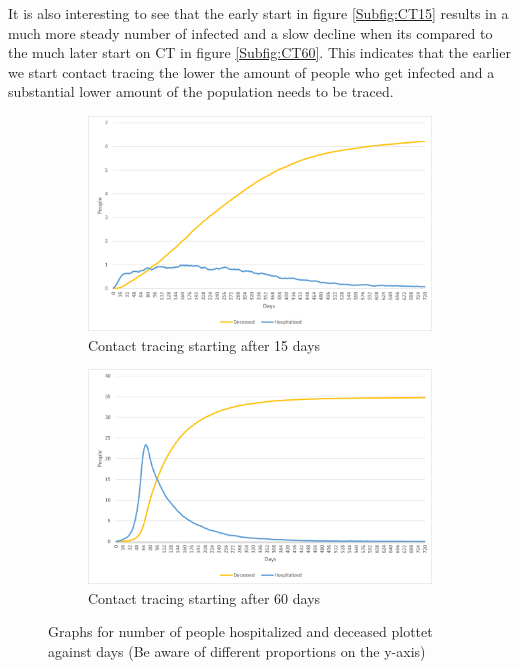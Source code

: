 It is also interesting to see that the early start in figure \ref{Subfig:CT15} results in a much more steady number of infected and a slow decline when its compared to the much later start on CT in figure \ref{Subfig:CT60}. This indicates that the earlier we start contact tracing the lower the amount of people who get infected and a substantial lower amount of the population needs to be traced.

\begin{figure}[H]
\centering
\begin{subfigure}{.5\textwidth}
  \centering
  \includegraphics[width=.95\linewidth]{0_billeder/CT15DaysDH.png}
  \caption{Contact tracing starting after 15 days}
  \label{Subfig:CT15DH}
\end{subfigure}%
\begin{subfigure}{.5\textwidth}
  \centering
  \includegraphics[width=.95\linewidth]{0_billeder/CT60DaysDH.png}
  \caption{Contact tracing starting after 60 days}
  \label{Subfig:CT60DH}
\end{subfigure}
\caption{Graphs for number of people hospitalized and deceased plottet against days (Be aware of different proportions on the y-axis)}
\label{fig:CTstart2}
\end{figure}

